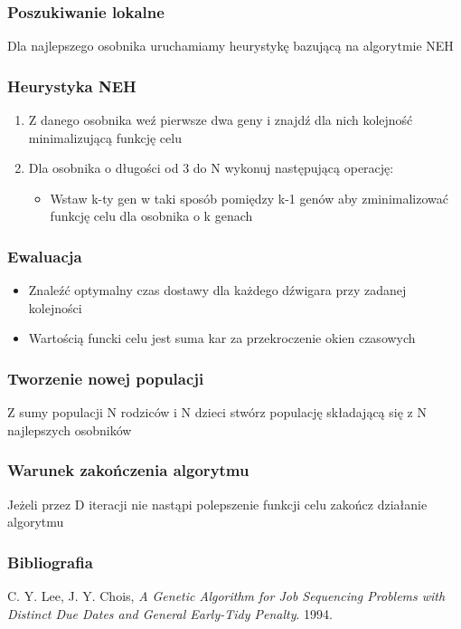 \documentclass{beamer}
\begin{document}
\begin{frame}
 \frametitle{Poszukiwanie lokalne}
 
 Dla najlepszego osobnika uruchamiamy heurystykę bazującą na algorytmie NEH


\end{frame}


\begin{frame}
 \frametitle{ Heurystyka NEH}
 \begin{enumerate}
  \item Z danego osobnika weź pierwsze dwa geny i znajdź dla nich kolejność minimalizującą funkcję celu
  \item Dla osobnika o długości od 3 do N wykonuj następującą operację:
  \begin{itemize}
   \item Wstaw k-ty gen w taki sposób pomiędzy k-1 genów aby zminimalizować funkcję celu dla osobnika o k genach
  \end{itemize}
 \end{enumerate}
 \end{frame}
 
 
 
 \begin{frame}
 \frametitle{ Ewaluacja }
 \begin{itemize}
 \item Znaleźć optymalny czas dostawy dla każdego dźwigara przy zadanej kolejności
 \item Wartością funcki celu jest suma kar za przekroczenie okien czasowych
 \end{itemize}
 
 \end{frame}
 

 
 
 \begin{frame}
 \frametitle{ Tworzenie nowej populacji }
 Z sumy populacji N rodziców i N dzieci stwórz populację składającą się z N najlepszych osobników

\end{frame}


 \begin{frame}
 \frametitle{ Warunek zakończenia algorytmu }
Jeżeli przez D iteracji nie nastąpi polepszenie funkcji celu zakończ działanie algorytmu

\end{frame}

\begin{frame}
\frametitle{Bibliografia}
\begin{thebibliography}{1}

  C. Y. Lee, J. Y. Chois,
  \emph{ A Genetic Algorithm for Job Sequencing Problems with Distinct Due Dates and General Early-Tidy Penalty}.
  1994.

\end{thebibliography}
\end{frame}
\end{document}
